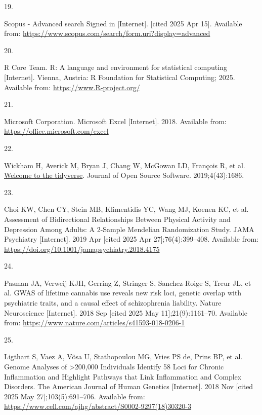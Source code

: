 \documentclass[
]{article}
\newlength{\cslhangindent}
\newlength{\csllabelwidth}
\newenvironment{CSLReferences}[2] %
 {\begin{list}{}{%
  \setlength{\itemindent}{0pt}
  \setlength{\leftmargin}{0pt}
  \setlength{\parsep}{0pt}
  \ifodd #1
   \setlength{\leftmargin}{\cslhangindent}
   \setlength{\itemindent}{-1\cslhangindent}
  \fi
  \setlength{\itemsep}{#2\baselineskip}}}
 {\end{list}}
\newcommand{\CSLLeftMargin}[1]{\parbox[t]{\csllabelwidth}{\strut#1\strut}}
\newcommand{\CSLRightInline}[1]{\parbox[t]{\linewidth - \csllabelwidth}{\strut#1\strut}}
\begin{document}
\begin{CSLReferences}{0}{1}
\CSLLeftMargin{19. }%
\CSLRightInline{Scopus - {Advanced} search {\textbar} {Signed} in {[}Internet{]}. {[}cited 2025 Apr 15{]}. Available from: \url{https://www.scopus.com/search/form.uri?display=advanced}}

\CSLLeftMargin{20. }%
\CSLRightInline{R Core Team. {R}: A language and environment for statistical computing {[}Internet{]}. Vienna, Austria: R Foundation for Statistical Computing; 2025. Available from: \url{https://www.R-project.org/}}

\CSLLeftMargin{21. }%
\CSLRightInline{Microsoft Corporation. Microsoft {Excel} {[}Internet{]}. 2018. Available from: \url{https://office.microsoft.com/excel}}

\CSLLeftMargin{22. }%
\CSLRightInline{Wickham H, Averick M, Bryan J, Chang W, McGowan LD, François R, et al. \href{https://doi.org/10.21105/joss.01686}{Welcome to the {tidyverse}}. Journal of Open Source Software. 2019;4(43):1686. }

\CSLLeftMargin{23. }%
\CSLRightInline{Choi KW, Chen CY, Stein MB, Klimentidis YC, Wang MJ, Koenen KC, et al. Assessment of {Bidirectional} {Relationships} {Between} {Physical} {Activity} and {Depression} {Among} {Adults}: {A} 2-{Sample} {Mendelian} {Randomization} {Study}. JAMA Psychiatry {[}Internet{]}. 2019 Apr {[}cited 2025 Apr 27{]};76(4):399--408. Available from: \url{https://doi.org/10.1001/jamapsychiatry.2018.4175}}

\CSLLeftMargin{24. }%
\CSLRightInline{Pasman JA, Verweij KJH, Gerring Z, Stringer S, Sanchez-Roige S, Treur JL, et al. {GWAS} of lifetime cannabis use reveals new risk loci, genetic overlap with psychiatric traits, and a causal effect of schizophrenia liability. Nature Neuroscience {[}Internet{]}. 2018 Sep {[}cited 2025 May 11{]};21(9):1161--70. Available from: \url{https://www.nature.com/articles/s41593-018-0206-1}}

\CSLLeftMargin{25. }%
\CSLRightInline{Ligthart S, Vaez A, Võsa U, Stathopoulou MG, Vries PS de, Prins BP, et al. Genome {Analyses} of {\textgreater{}}200,000 {Individuals} {Identify} 58 {Loci} for {Chronic} {Inflammation} and {Highlight} {Pathways} that {Link} {Inflammation} and {Complex} {Disorders}. The American Journal of Human Genetics {[}Internet{]}. 2018 Nov {[}cited 2025 May 27{]};103(5):691--706. Available from: \url{https://www.cell.com/ajhg/abstract/S0002-9297(18)30320-3}}


\end{CSLReferences}
\end{document}
